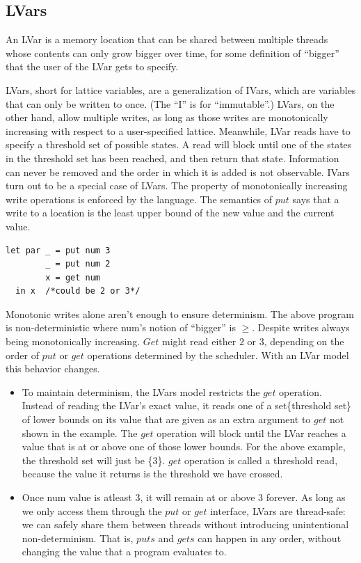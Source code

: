 \documentclass[twocolumn]{article}
\begin{document}
\subsection{LVars}
An LVar is a memory location that can be shared between multiple threads whose contents can only grow bigger over time, for some definition of “bigger” that the user of the LVar gets to specify. \par
LVars, short for lattice variables, are a generalization of IVars, which are variables that can only be written to once. (The “I” is for “immutable”.) LVars, on the other hand, allow multiple writes, as long as those writes are monotonically increasing with respect to a user-specified lattice. Meanwhile, LVar reads have to specify a threshold set of possible states. A read will block until one of the states in the threshold set has been reached, and then return that state. Information can never be removed and the order in which it is added is not observable. IVars turn out to be a special case of LVars. 
The property of monotonically increasing write operations is enforced by the language. The semantics of $put$ says that a write to a location is the least upper bound of the new value and the current value. 
\begin{verbatim}
let par _ = put num 3
        _ = put num 2
        x = get num
  in x  /*could be 2 or 3*/
\end{verbatim}
Monotonic writes alone aren't enough to ensure determinism. The above program is non-deterministic where num's notion of “bigger” is $\geq$. Despite writes always being monotonically increasing. $Get$ might read either $2$ or $3$, depending on the order of $put$ or $get$ operations determined by the scheduler. With an LVar model this behavior changes.\par
\begin{itemize}
\item To maintain determinism, the LVars model restricts the $get$ operation. Instead of reading the LVar’s exact value, it reads one of a set\{threshold set\} of lower bounds on its value that are given as an extra argument to $get$ not shown in the example. The $get$ operation will block until the LVar reaches a value that is at or above one of those lower bounds. For the above example, the threshold set will just be \{$3$\}. $get$ operation is called a threshold read, because the value it returns is the threshold we have crossed.
\item Once num value is atleast $3$, it will remain at or above $3$ forever. As long as we only access them through the $put$ or $get$ interface, LVars are thread-safe: we can safely share them between threads without introducing unintentional non-determinism. That is, $puts$ and $gets$ can happen in any order, without changing the value that a program evaluates to.
\end{itemize}
\end{document}
